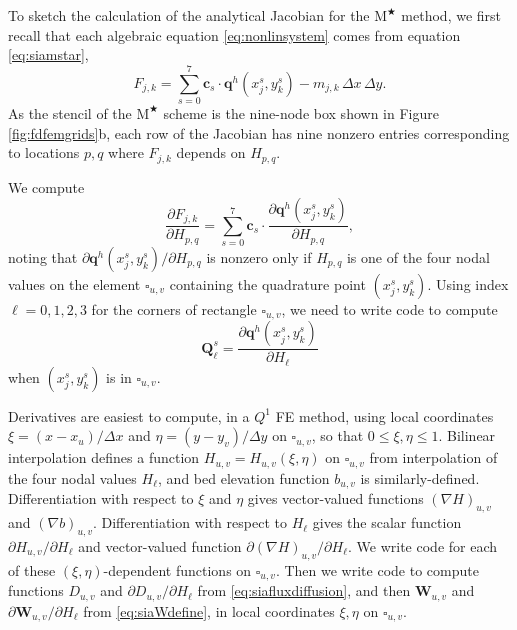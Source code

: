\documentclass[twocolumn,a4paper]{igs}
\newcommand\bc{\mathbf{c}}
\newcommand\bq{\mathbf{q}}
\newcommand\bQ{\mathbf{Q}}
\newcommand\bW{\mathbf{W}}
\newcommand{\grad}{\nabla}
\newcommand{\Mstar}{$\text{M}^{\bigstar}$\xspace}
\begin{document}
To sketch the calculation of the analytical Jacobian for the \Mstar method, we first recall that each algebraic equation \eqref{eq:nonlinsystem} comes from equation \eqref{eq:siamstar},
\begin{equation}
  F_{j,k} = \sum_{s=0}^7 \bc_s\cdot \bq^h(x_j^s,y_k^s) - m_{j,k}\,\Delta x\,\Delta y.  \label{eq:res}
\end{equation}
As the stencil of the \Mstar scheme is the nine-node box shown in Figure \ref{fig:fdfemgrids}b, each row of the Jacobian has nine nonzero entries corresponding to locations $p,q$ where $F_{j,k}$ depends on $H_{p,q}$.

We compute
\begin{equation}
\frac{\partial F_{j,k}}{\partial H_{p,q}} = \sum_{s=0}^7 \bc_s\cdot \frac{\partial \bq^h(x_j^s,y_k^s)}{\partial H_{p,q}}, \label{eq:jacQsum}
\end{equation}
noting that $\partial \bq^h(x_j^s,y_k^s)/\partial H_{p,q}$ is nonzero only if $H_{p,q}$ is one of the four nodal values on the element $\square_{u,v}$ containing the quadrature point $(x_j^s,y_k^s)$.  Using index $\ell=0,1,2,3$ for the corners of rectangle $\square_{u,v}$, we need to write code to compute
\begin{equation}
\bQ_\ell^s = \frac{\partial \bq^h(x_j^s,y_k^s)}{\partial H_\ell} \label{eq:jacthegoal}
\end{equation}
when $(x_j^s,y_k^s)$ is in $\square_{u,v}$.

\newcommand{\uppoint}{(\xi_{\text{up}}^s,\eta_{\text{up}}^s)}
Derivatives are easiest to compute, in a $Q^1$ FE method, using local coordinates $\xi=(x-x_u)/\Delta x$ and $\eta=(y-y_v)/\Delta y$ on $\square_{u,v}$, so that $0\le \xi,\eta \le 1$.  Bilinear interpolation defines a function $H_{u,v}=H_{u,v}(\xi,\eta)$ on $\square_{u,v}$ from interpolation of the four nodal values $H_\ell$, and bed elevation function $b_{u,v}$ is similarly-defined.  Differentiation with respect to $\xi$ and $\eta$ gives vector-valued functions $(\grad H)_{u,v}$ and $(\grad b)_{u,v}$.  Differentiation with respect to $H_\ell$ gives the scalar function $\partial H_{u,v}/\partial H_\ell$ and vector-valued function $\partial (\grad H)_{u,v}/\partial H_\ell$.  We write code for each of these $(\xi,\eta)$-dependent functions on $\square_{u,v}$.  Then we write code to compute functions $D_{u,v}$ and $\partial D_{u,v}/\partial H_\ell$ from \eqref{eq:siafluxdiffusion}, and then $\bW_{u,v}$ and $\partial \bW_{u,v}/\partial H_\ell$ from \eqref{eq:siaWdefine}, in local coordinates $\xi,\eta$ on $\square_{u,v}$.
\end{document}
